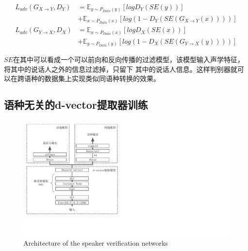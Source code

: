 \begin{align}
    L_{adv}(G_{X\rightarrow Y},D_Y) & =\mathbb{E}_{y\sim P_{Data}(y)}\left[log D_Y(SE(y))\right] \\
    & + \mathbb{E}_{x\sim P_{Data}(x)}\left[log(1-D_Y(SE(G_{X\rightarrow Y}(x))))\right] \\
    L_{adv}(G_{Y\rightarrow X},D_X) & =\mathbb{E}_{x\sim P_{Data}(x)}\left[log D_X(SE(x))\right] \\
    & + \mathbb{E}_{y\sim P_{Data}(y)}\left[log(1-D_X(SE(G_{Y\rightarrow X}(y))))\right]
\end{align}

$SE$在其中可以看成一个可以前向和反向传播的过滤模型，该模型输入声学特征，将其中的说话人之外的信息过滤掉，只留下
其中的说话人信息。这样判别器就可以在跨语种的数据集上实现类似同语种转换的效果。



\subsection{语种无关的d-vector提取器训练}


\begin{figure}[!htp]
    \centering
    \includegraphics[width=12cm,trim=0 79 380 0,clip]{figure/5_d.pdf}
    {Architecture of the speaker verification networks}
    \label{fig:5d}
\end{figure}

